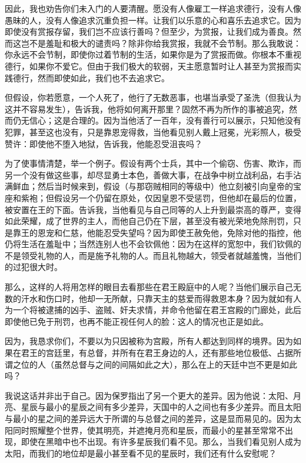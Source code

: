 因此，我也劝告你们未入门的人要清醒。愿没有人像雇工一样追求德行，没有人像愚昧的人，没有人像追求沉重负担一样。让我们以乐意的心和喜乐去追求它。因为即使没有赏报存留，我们岂不应该行善吗？但至少，为赏报，让我们成为善良。然而这岂不是羞耻和极大的谴责吗？除非你给我赏报，我就不会节制。那么我敢说：你永远不会节制，即使你过着节制的生活，如果你是为了赏报而做。你根本不重视德行，如果你不爱它。但由于我们极大的软弱，天主愿意暂时让人甚至为赏报而实践德行，然而即使如此，我们也不去追求它。\par

但假设，你若愿意，一个人死了，他行了无数恶事，也堪当承受了圣洗（但我认为这并不容易发生），告诉我，他将如何离开那里？固然不再为所作的事被追究，然而仍无信心；这是合理的。因为当他活了一百年，没有善行可以展示，只知他没有犯罪，甚至这也没有，只是靠恩宠得救，当他看见别人戴上冠冕，光彩照人，极受赞许：即使他不堕入地狱，告诉我，他能忍受沮丧吗？\par

为了使事情清楚，举一个例子。假设有两个士兵，其中一个偷窃、伤害、欺诈，而另一个没有做这些事，却尽显勇士本色，善做大事，在战争中树立战利品，右手沾满鲜血；然后当时候来到，假设（与那窃贼相同的等级中）他立刻被引向皇帝的宝座和紫袍；但假设另一个仍留在原处，仅因皇恩不受惩罚，但他却在最后的位置，被安置在王的下面。告诉我，当他看见与自己同等的人上升到最崇高的尊严，变得如此荣耀，成了世界的主人，而他自己仍在下层，甚至没有被光荣地免除刑罚，只是靠王的恩宠和仁慈，他能忍受失望吗？因为即使王赦免他，免除对他的指控，他仍将生活在羞耻中；当然连别人也不会钦佩他：因为在这样的宽恕中，我们钦佩的不是领受礼物的人，而是施予礼物的人。而且礼物越大，领受者就越羞愧，当他们的过犯很大时。\par

那么，这样的人将用怎样的眼目去看那些在君王殿庭中的人呢？当他们展示自己无数的汗水和伤口时，他却一无所献，只靠天主的慈爱而得救恩本身？因为就如有人为一个将被逮捕的凶手、盗贼、奸夫求情，并命令他留在君王宫殿的门廊处，此后即使他已免于刑罚，也再不能正视任何人的脸：这人的情况也正是如此。\par

因为，我恳求你们，不要以为只因被称为宫殿，所有人都达到同样的境界。因为如果在君王的宫廷里，有总督，并所有在君王身边的人，还有那些地位极低、占据所谓之位的人（虽然总督与之间的间隔如此之大），那么在上的天廷中岂不更是如此吗？\par

我说这话并非出于自己。因为保罗指出了另一个更大的差异。因为他说：太阳、月亮、星辰与最小的星辰之间有多少差异，天国中的人之间也有多少差异。而且太阳与最小的星之间的差异远大于所谓的与总督之间的差异，这是显而易见的。因为太阳同时照耀整个世界，使其明亮，并遮掩月亮和星辰，而最小的星甚至常常不出现，即使在黑暗中也不出现。有许多星辰我们看不见。那么，当我们看见别人成为太阳，而我们的地位却是最小甚至看不见的星辰时，我们还有什么安慰呢？\par

